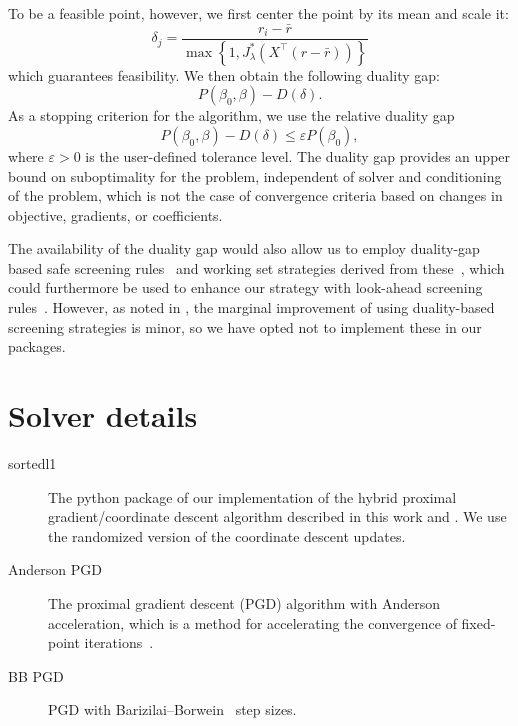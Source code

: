 \documentclass[article]{jss}
\begin{document}
\begin{appendix}
  To be a feasible point, however, we first center the point by its mean and
  scale it:
  \[
    \delta_j = \frac{r_i - \bar{r}}{\max\left\{1, J_\lambda^*\left(X^\intercal(r - \bar{r})\right) \right\}}
  \]
  which guarantees feasibility. We then obtain the following duality gap:
  \[
    P(\beta_0, \beta) - D(\delta).
  \]
  As a stopping criterion for the algorithm, we use the relative duality gap
  \[
    P(\beta_0, \beta) - D(\delta) \leq \varepsilon P(\beta_0),
  \]
  where \(\varepsilon >0\) is the user-defined tolerance level.
  The duality gap provides an upper bound on suboptimality for the problem, independent
  of solver and conditioning of the problem, which is not the case of
  convergence criteria based on changes in objective, gradients, or coefficients.

  The availability of the duality gap would also allow us to employ
  duality-gap based safe screening rules~\citep{fercoq2015} and
  working set strategies derived from these~\citep{massias2018}, which
  could furthermore be used to enhance our strategy with look-ahead
  screening rules~\citep{larsson2021a}. However,
  as noted in \citet{larsson2022d}, the marginal improvement
  of using duality-based screening strategies is minor, so we have
  opted not to implement these in our packages.
  \section{Solver details}\label{sec:solver-details}

  \begin{description}
    \item[sortedl1] The python package of our implementation of the hybrid
          proximal gradient/coordinate descent algorithm described in this work and
          \citet{larsson2023}. We use the randomized version of the coordinate descent
          updates.

    \item[Anderson PGD] The proximal gradient descent (PGD) algorithm with Anderson acceleration, which is a
          method for accelerating the convergence of fixed-point
          iterations~\citep{anderson1965,zhang2020}.
    \item[BB PGD] PGD with Barizilai--Borwein~\citep{barzilai1988} step sizes.


\end{description}
\end{appendix}
\end{document}
